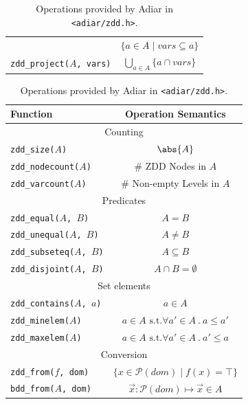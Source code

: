 \documentclass[english, aspectratio=169]{beamer}
\newcommand{\pow}[0]{\ensuremath{\mathcal{P}}}
\newcommand{\vars}[0]{\ensuremath{\mathit{vars}}}
\newcommand{\dom}[0]{\ensuremath{\mathit{dom}}}
\begin{document}
\begin{frame}
\begin{table}
\begin{tabular}[t]{l | c}
      & $\{ a \in A \mid \vars \subseteq a \}$
      \\
      \texttt{zdd\_project($A$, vars)}
      & $\bigcup_{a \in A} \{ a \cap \vars \}$
    \end{tabular}
    \quad
    \begin{tabular}[t]{l | c}
      Function
      & Operation Semantics
      \\ \hline \hline
      \multicolumn{2}{c}{Counting}
      \\ \hline
      \texttt{zdd\_size($A$)}
      & $\abs{A}$
      \\
      \texttt{zdd\_nodecount($A$)}
      & \# ZDD Nodes in $A$
      \\
      \texttt{zdd\_varcount($A$)}
      & \# Non-empty Levels in $A$
      \\ \hline
      \multicolumn{2}{c}{Predicates}
      \\ \hline
      \texttt{zdd\_equal($A$, $B$)}
      & $A = B$
      \\
      \texttt{zdd\_unequal($A$, $B$)}
      & $A \neq B$
      \\
      \texttt{zdd\_subseteq($A$, $B$)}
      & $A \subseteq B$
      \\
      \texttt{zdd\_disjoint($A$, $B$)}
      & $A \cap B = \emptyset$
      \\ \hline
      \multicolumn{2}{c}{Set elements}
      \\ \hline
      \texttt{zdd\_contains($A$, $a$)}
      & $a \in A$
      \\
      \texttt{zdd\_minelem($A$)}
      & $a \in A \text{ s.t.}  \forall a'\in A\ .\ a \leq a'$
      \\
      \texttt{zdd\_maxelem($A$)}
      & $a \in A \text{ s.t.}  \forall a'\in A\ .\ a' \leq a$
      \\ \hline
      \multicolumn{2}{c}{Conversion}
      \\ \hline
      \texttt{zdd\_from($f$, dom)}
      & $\{ x \in \pow(\dom) \mid f(x) = \top \}$
      \\
      \texttt{bdd\_from($A$, dom)}
      & $\vec{x} : \pow(\dom) \mapsto \vec{x} \in A$
    \end{tabular}

    \caption{Operations provided by Adiar in \texttt{<adiar/zdd.h>}.}
  \end{table}
\end{frame}
\end{document}
